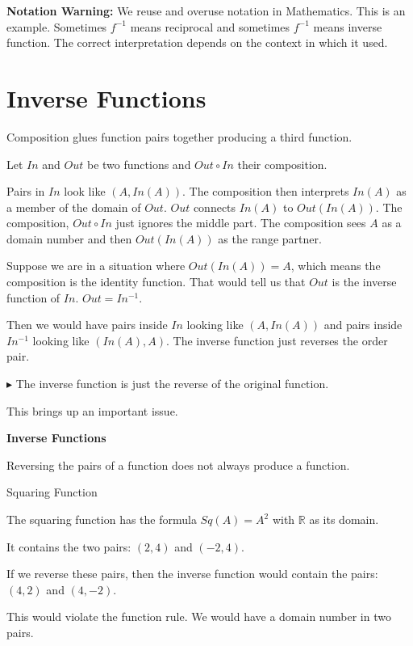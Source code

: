 \documentclass{ximera}
\begin{document}
\textbf{Notation Warning:} We reuse and overuse notation in Mathematics.  This is an example.  Sometimes $f^{-1}$ means reciprocal and sometimes $f^{-1}$ means inverse function.  The correct interpretation depends on the context in which it used.













\section*{Inverse Functions}




Composition glues function pairs together producing a third function.

Let $In$ and $Out$ be two functions and $Out \circ In$ their composition.


Pairs in $In$ look like $(A, In(A))$.   The composition then interprets $In(A)$ as a member of the domain of $Out$.  $Out$ connects $In(A)$ to $Out(In(A))$.   The composition, $Out \circ In$ just ignores the middle part.  The composition sees $A$ as a domain number and then $Out(In(A))$ as the range partner.


Suppose we are in a situation where $Out(In(A)) = A$, which means the composition is the identity function.  That would tell us that $Out$ is the inverse function of $In$.  $Out = In^{-1}$.

Then we would have pairs inside $In$ looking like $(A, In(A))$ and pairs inside $In^{-1}$ looking like $(In(A), A)$.  The inverse function just reverses the order pair. 


\textbf{\textcolor{blue!75!black}{$\blacktriangleright$}}  The inverse function is just the reverse of the original function. 


This brings up an important issue.


\begin{warning} \textbf{\textcolor{red!80!black}{Inverse Functions}} 

Reversing the pairs of a function does not always produce a function.


\end{warning}




\begin{example} Squaring Function


The squaring function has the formula $Sq(A) =A^2$ with \textbf{$\mathbb{R}$} as its domain.

It contains the two pairs: $(2, 4)$ and $(-2, 4)$.



If we reverse these pairs, then the inverse function would contain the pairs: $(4, 2)$ and $(4,-2)$.

This would violate the function rule.  We would have a domain number in two pairs.

\end{example}
\end{document}
